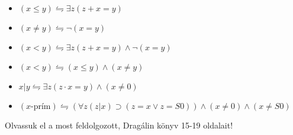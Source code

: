 \documentclass{article}
\begin{document}
\begin{itemize}
\item
$ (x \le y) \leftrightharpoons \exists z(z+x=y)$ 

\item
$ (x \neq y) \leftrightharpoons  \neg (x=y)$ 

\item
$ (x < y) \leftrightharpoons \exists z(z+x=y) \wedge \neg (x=y)$ 

\item
$ (x < y) \leftrightharpoons  (x \le y )\wedge ( x \neq y)$ 

\item
$ x \vert y \leftrightharpoons \exists z ( z \cdot x=y )\wedge ( x \neq 0)$ 

\item
$ (x \text{-prím}) \leftrightharpoons  (\forall z( z \vert x )\supset ( z = x \vee z=S0))\wedge ( x \neq 0)\wedge ( x \neq S0)$ 

 \end{itemize}

Olvassuk el a most feldolgozott, Dragálin könyv 15-19 oldalait!
\end{document}
